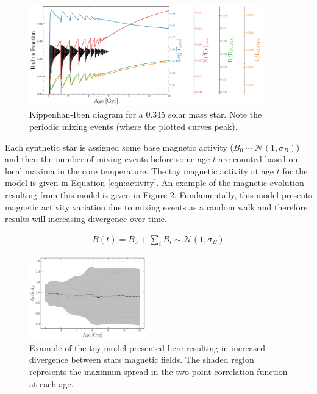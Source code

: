 \begin{figure}
  \centering
  \includegraphics[width=0.9\textwidth]{Kippenhan_clamped.pdf}
  \caption{Kippenhan-Iben diagram for a 0.345 solar mass star. Note the
  periodic mixing events (where the plotted curves peak).}
  \label{fig:kippenhan}
\end{figure}

Each synthetic star is assigned some base magnetic activity ($B_{0} \sim
\mathcal{N}(1, \sigma_{B})$) and then the number of mixing events before some age $t$
are counted based on local maxima in the core temperature. The toy magnetic
activity at age $t$ for the model is given in Equation \ref{eqn:activity}. An
example of the magnetic evolution resulting from this model is given in Figure
\ref{fig:simpleB}. Fundamentally, this model presents magnetic
activity variation due to mixing events as a random walk and therefore results will
increasing divergence over time.

\begin{align}\label{eqn:activity}
  B(t) = B_{0} + \sum_{i}B_{i} \sim \mathcal{N}(1, \sigma_{B}) 
\end{align}

\begin{figure}
  \centering
  \includegraphics[width=0.45\textwidth]{simpleBEvolution.pdf}
  \caption{Example of the toy model presented here resulting in increased
  divergence between stars magnetic fields. The shaded region represents the
  maximum spread in the two point correlation function at each age.}
  \label{fig:simpleB}
\end{figure}

